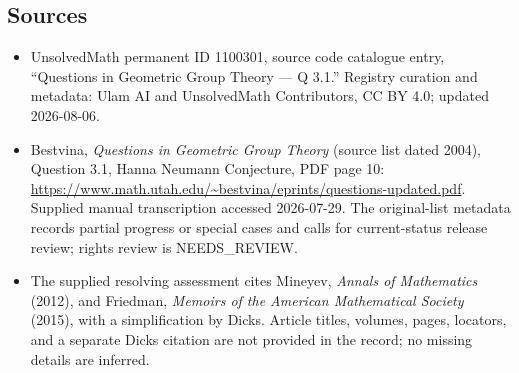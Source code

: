 \documentclass[11pt]{article}
\begin{document}
\subsection{Sources}
\begin{itemize}
\item UnsolvedMath permanent ID 1100301, source code catalogue entry, ``Questions in Geometric Group Theory --- Q 3.1.'' Registry curation and metadata: Ulam AI and UnsolvedMath Contributors, CC BY 4.0; updated 2026-08-06.
\item Bestvina, \emph{Questions in Geometric Group Theory} (source list dated 2004), Question 3.1, Hanna Neumann Conjecture, PDF page 10: \url{https://www.math.utah.edu/~bestvina/eprints/questions-updated.pdf}. Supplied manual transcription accessed 2026-07-29. The original-list metadata records partial progress or special cases and calls for current-status release review; rights review is NEEDS\_REVIEW.
\item The supplied resolving assessment cites Mineyev, \emph{Annals of Mathematics} (2012), and Friedman, \emph{Memoirs of the American Mathematical Society} (2015), with a simplification by Dicks. Article titles, volumes, pages, locators, and a separate Dicks citation are not provided in the record; no missing details are inferred.
\end{itemize}
\end{document}
